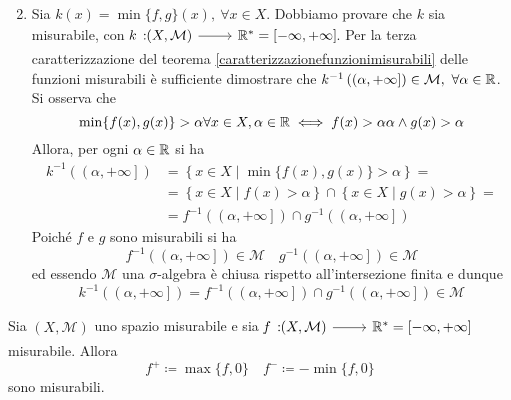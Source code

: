 \begin{demonstration}
\begin{enumerate}
\begin{equation*}
	\end{equation*}
		\item Sia $ k(x)=\min\{f,g\}(x),\ \forall x\in X$. Dobbiamo provare che $k$ sia misurabile, con $\funz{k}{\left(X,\mathcal{M}\right)}{\realset^{\ast}=\left[-\infty,+\infty\right]}$. Per la terza caratterizzazione del teorema \ref{caratterizzazionefunzionimisurabili} delle funzioni misurabili è sufficiente dimostrare che $k^{-1}\left(\left(\alpha,+\infty\right]\right)\in\mathcal{M},\ \forall\alpha\in\realset$.
		Si osserva che
		\begin{equation*}
			\min\{f(x),g(x)\}>\alpha \forall x\in X, \alpha\in\mathbb{R}\iff f(x)>\alpha \alpha\wedge g(x)> \alpha
		\end{equation*}
		Allora, per ogni $\alpha\in\mathbb{R}$ si ha
		\begin{align*}
			k^{-1}\left(\left(\alpha,+\infty\right]\right)&=\left\{x\in X\mid \min\{f(x),g(x)\}>\alpha\right\}=\\
			&=\left\{x\in X\mid f(x)> \alpha\right\}\cap\left\{x\in X\mid g(x)>\alpha\right\}=\\
			&=f^{-1}\left(\left(\alpha,+\infty\right]\right)\cap g^{-1}\left(\left(\alpha,+\infty\right]\right)
		\end{align*}
		Poiché $f$ e $g$ sono misurabili si ha
		\begin{equation*}
			f^{-1}\left(\left(\alpha,+\infty\right]\right)\in\mathcal{M}\quad g^{-1}\left(\left(\alpha,+\infty\right]\right)\in\mathcal{M}
		\end{equation*}
		ed essendo $\mathcal{M}$ una $\sigma$-algebra è chiusa rispetto all'intersezione finita e dunque
		\begin{equation*}
			k^{-1}\left(\left(\alpha,+\infty\right]\right)=f^{-1}\left(\left(\alpha,+\infty\right]\right)\cap g^{-1}\left(\left(\alpha,+\infty\right]\right)\in\mathcal{M}
		\end{equation*}
	\end{enumerate}
\end{demonstration}
\begin{corollary}
	Sia $ \left(X,\mathcal{M}\right)$ uno spazio misurabile e sia $\funz{f}{\left(X,\mathcal{M}\right)}{\realset^{\ast}=\left[-\infty,+\infty\right]}$ misurabile.
	Allora
	\begin{equation*}
		f^{+}\coloneqq \max\{f,0\}\quad f^{-}\coloneqq-\min\{f,0\}
	\end{equation*}
	sono misurabili.
\end{corollary}
